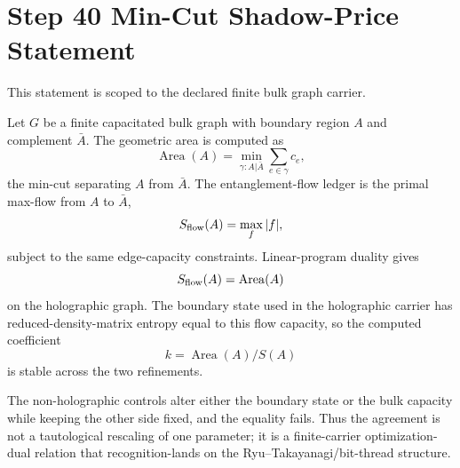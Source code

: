 \documentclass[11pt]{article}
\begin{document}
\section*{Step 40 Min-Cut Shadow-Price Statement}
This statement is scoped to the declared finite bulk graph carrier.

Let \(G\) be a finite capacitated bulk graph with boundary region \(A\) and complement \(\bar A\). The geometric area is computed as
\[
  \operatorname{Area}(A)=\min_{\gamma:A|\bar A}\sum_{e\in\gamma} c_e,
\]
the min-cut separating \(A\) from \(\bar A\). The entanglement-flow ledger is the primal max-flow from \(A\) to \(\bar A\),
\[
  S_{\rm flow}(A)=\max_f |f|,
\]
subject to the same edge-capacity constraints. Linear-program duality gives
\[
  S_{\rm flow}(A)=\operatorname{Area}(A)
\]
on the holographic graph. The boundary state used in the holographic carrier has reduced-density-matrix entropy equal to this flow capacity, so the computed coefficient
\[
  k = \operatorname{Area}(A)/S(A)
\]
is stable across the two refinements.

The non-holographic controls alter either the boundary state or the bulk capacity while keeping the other side fixed, and the equality fails. Thus the agreement is not a tautological rescaling of one parameter; it is a finite-carrier optimization-dual relation that recognition-lands on the Ryu--Takayanagi/bit-thread structure.
\end{document}
